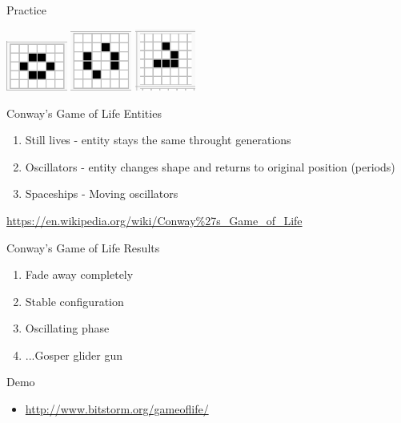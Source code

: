 \documentclass[bigger]{beamer}
\begin{document}
\begin{frame}[label=sec-17]{Practice}
\begin{center}
\includegraphics[width=2cm]{images/beehive.png}
\includegraphics[width=2cm]{images/toad.png}
\includegraphics[width=2cm]{images/glider.png}
\end{center}
\end{frame}
\begin{frame}[label=sec-18]{Conway's Game of Life Entities}
\begin{enumerate}
\item<1->Still lives - entity stays the same throught generations
\item<2->Oscillators - entity changes shape and returns to original position (periods)
\item<3->Spaceships - Moving oscillators
\end{enumerate}
\url{https://en.wikipedia.org/wiki/Conway\%27s_Game_of_Life}
\end{frame}
\begin{frame}[label=sec-19]{Conway's Game of Life Results}
\begin{enumerate}
\item<1->Fade away completely
\item<2->Stable configuration
\item<3->Oscillating phase
\item<4->...Gosper glider gun
\end{enumerate}
\end{frame}
\begin{frame}[label=sec-20]{Demo}
\begin{itemize}
\item \url{http://www.bitstorm.org/gameoflife/}
\end{itemize}
\end{frame}
\end{document}
